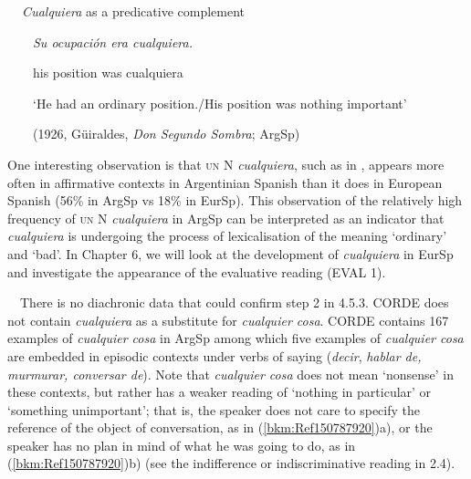 \begin{styleStandard}
\label{bkm:Ref150787886}\textbf{\ \ }\textit{Cualquiera} as a predicative complement
\end{styleStandard}

\begin{styleStandard}
\ \ \ \ \textit{Su ocupación era cualquiera.}
\end{styleStandard}

\begin{styleStandard}
\ \ \ \ his position was cualquiera
\end{styleStandard}

\begin{styleStandard}
\ \ \ \ ‘He had an ordinary position./His position was nothing important’
\end{styleStandard}

\begin{styleListParagraph}
\textmd{\ \ \ \ (1926, Güiraldes, }\textmd{\textit{Don Segundo Sombra}}\textmd{; ArgSp)}
\end{styleListParagraph}

\begin{styleStandard}
One interesting observation is that \textsc{un} N \textit{cualquiera}, such as in , appears more often in affirmative contexts in Argentinian Spanish than it does in European Spanish (56\% in ArgSp vs 18\% in EurSp). This observation of the relatively high frequency of \textsc{un} N \textit{cualquiera} in ArgSp can be interpreted as an indicator that \textit{cualquiera} is undergoing the process of lexicalisation of the meaning ‘ordinary’ and ‘bad’. In Chapter 6, we will look at the development of \textit{cualquiera} in EurSp and investigate the appearance of the evaluative reading (EVAL 1).
\end{styleStandard}

\begin{styleStandard}
\ \ There is no diachronic data that could confirm step 2 in 4.5.3. CORDE does not contain \textit{cualquiera} as a substitute for \textit{cualquier cosa}. CORDE contains 167 examples of \textit{cualquier cosa} in ArgSp among which five examples of \textit{cualquier cosa} are embedded in episodic contexts under verbs of saying (\textit{decir}, \textit{hablar de, murmurar, conversar de}). Note that \textit{cualquier cosa} does not mean ‘nonsense’ in these contexts, but rather has a weaker reading of ‘nothing in particular’ or ‘something unimportant’; that is, the speaker does not care to specify the reference of the object of conversation, as in (\ref{bkm:Ref150787920})a), or the speaker has no plan in mind of what he was going to do, as in (\ref{bkm:Ref150787920})b) (see the indifference or indiscriminative reading in 2.4).
\end{styleStandard}

